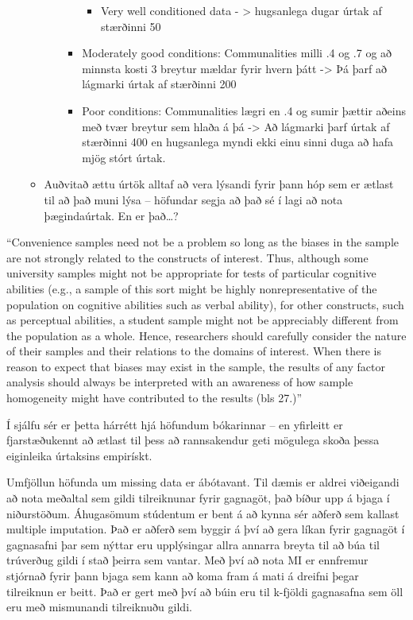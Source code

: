 \documentclass[]{book}
\providecommand{\tightlist}{%
  \setlength{\itemsep}{0pt}\setlength{\parskip}{0pt}}
\begin{document}
\begin{itemize}
\begin{itemize}
\begin{itemize}
\begin{itemize}
        \begin{itemize}
        \tightlist
        \item
          Very well conditioned data - \textgreater{} hugsanlega dugar úrtak af stærðinni 50
        \end{itemize}
      \item
        Moderately good conditions: Communalities milli .4 og .7 og að minnsta kosti 3 breytur
        mældar fyrir hvern þátt -\textgreater{} Þá þarf að lágmarki úrtak af stærðinni 200
      \item
        Poor conditions: Communalities lægri en .4 og sumir þættir aðeins með tvær breytur sem
        hlaða á þá -\textgreater{} Að lágmarki þarf úrtak af stærðinni 400 en hugsanlega myndi ekki einu sinni
        duga að hafa mjög stórt úrtak.
      \end{itemize}
    \end{itemize}
  \item
    Auðvitað ættu úrtök alltaf að vera lýsandi fyrir þann hóp sem er ætlast til að það muni lýsa -- höfundar segja að það sé í lagi að nota þægindaúrtak. En er það\ldots{}?
  \end{itemize}
\end{itemize}

``Convenience samples need not be a problem so long as the biases in the sample are not strongly related to the constructs of interest. Thus, although some university samples might not be appropriate for tests of particular cognitive abilities (e.g., a sample of this sort might be highly nonrepresentative of the population on cognitive abilities such as verbal ability), for other constructs, such as perceptual abilities, a student sample might not be appreciably different from the population as a whole. Hence, researchers should carefully consider the nature of their samples and their relations to the domains of interest. When there is reason to expect that biases may exist in the sample, the results of any factor analysis should always be interpreted with an awareness of how sample homogeneity might have contributed to the results (bls 27.)''

Í sjálfu sér er þetta hárrétt hjá höfundum bókarinnar -- en yfirleitt er fjarstæðukennt að ætlast til þess að rannsakendur geti mögulega skoða þessa eiginleika úrtaksins empirískt.

Umfjöllun höfunda um missing data er ábótavant. Til dæmis er aldrei viðeigandi að nota meðaltal sem gildi tilreiknunar fyrir gagnagöt, það bíður upp á bjaga í niðurstöðum. Áhugasömum stúdentum er bent á að kynna sér aðferð sem kallast multiple imputation. Það er aðferð sem byggir á því að gera líkan fyrir gagnagöt í gagnasafni þar sem nýttar eru upplýsingar allra annarra breyta til að búa til trúverðug gildi í stað þeirra sem vantar. Með því að nota MI er ennfremur stjórnað fyrir þann bjaga sem kann að koma fram á mati á dreifni þegar tilreiknun er beitt. Það er gert með því að búin eru til k-fjöldi gagnasafna sem öll eru með mismunandi tilreiknuðu gildi.
\end{document}
